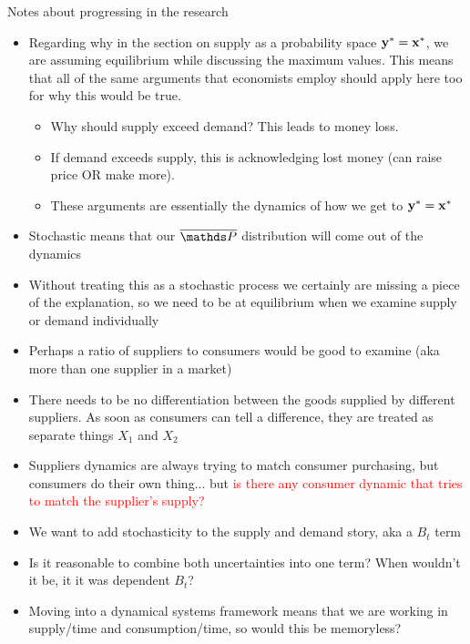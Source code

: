 Notes about progressing in the research
\begin{itemize}
	\item Regarding why in the section on supply as a probability space $\mathbf{y}^* = \mathbf{x}^*$, we are assuming equilibrium while discussing the maximum values. This means that all of the same arguments that economists employ should apply here too for why this would be true. %
	\begin{itemize}
		\item Why should supply exceed demand? This leads to money loss.
		\item If demand exceeds supply, this is acknowledging lost money (can raise price OR make more).
		\item These arguments are essentially the dynamics of how we get to $\mathbf{y}^* =\mathbf{x}^*$ 
	\end{itemize}
	\item Stochastic means that our $\Pbb$ distribution will come out of the dynamics
	\item Without treating this as a stochastic process we certainly are missing a piece of the explanation, so we need to be at equilibrium when we examine supply or demand individually
	\item Perhaps a ratio of suppliers to consumers would be good to examine (aka more than one supplier in a market)
	\item There needs to be no differentiation between the goods supplied by different suppliers. As soon as consumers can tell a difference, they are treated as separate things $X_1$ and $X_2$
	\item Suppliers dynamics are always trying to match consumer purchasing, but consumers do their own thing... but \textcolor{red}{is there any consumer dynamic that tries to match the supplier's supply?}
	\item We want to add stochasticity to the supply and demand story, aka a $B_t$ term
	\item Is it reasonable to combine both uncertainties into one term? When wouldn't it be, it it was dependent $B_t$? 
	\item Moving into a dynamical systems framework means that we are working in supply/time and consumption/time, so would this be memoryless?
\end{itemize}

























